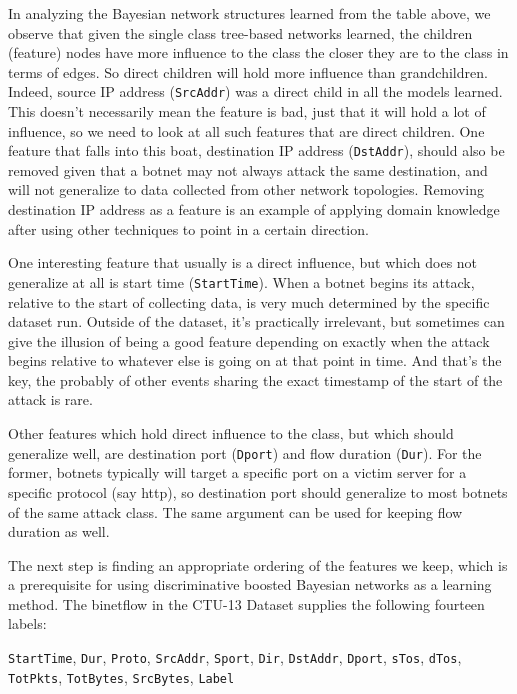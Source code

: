 \documentclass[letterpaper]{article}
\begin{document}
In analyzing the Bayesian network structures learned from the table above, we observe that given the single class tree-based networks learned, the children (feature) nodes have more influence to the class the closer they are to the class in terms of edges.  So direct children will hold more influence than grandchildren.  Indeed, source IP address (\texttt{SrcAddr}) was a direct child in all the models learned.  This doesn't necessarily mean the feature is bad, just that it will hold a lot of influence, so we need to look at all such features that are direct children.  One feature that falls into this boat, destination IP address (\texttt{DstAddr}), should also be removed given that a botnet may not always attack the same destination, and will not generalize to data collected from other network topologies. Removing destination IP address as a feature is an example of applying domain knowledge after using other techniques to point in a certain direction.

One interesting feature that usually is a direct influence, but which does not generalize at all is start time (\texttt{StartTime}).  When a botnet begins its attack, relative to the start of collecting data, is very much determined by the specific dataset run.  Outside of the dataset, it's practically irrelevant, but sometimes can give the illusion of being a good feature depending on exactly when the attack begins relative to whatever else is going on at that point in time.  And that's the key, the probably of other events sharing the exact timestamp of the start of the attack is rare.

Other features which hold direct influence to the class, but which should generalize well, are destination port (\texttt{Dport}) and flow duration (\texttt{Dur}). For the former, botnets typically will target a specific port on a victim server for a specific protocol (say http), so destination port should generalize to most botnets of the same attack class.  The same argument can be used for keeping flow duration as well.

The next step is finding an appropriate ordering of the features we keep, which is a prerequisite for using discriminative boosted Bayesian networks as a learning method.  The binetflow in the CTU-13 Dataset supplies the following fourteen labels:

\texttt{StartTime}, \texttt{Dur}, \texttt{Proto}, \texttt{SrcAddr}, \texttt{Sport}, \texttt{Dir}, \texttt{DstAddr}, \texttt{Dport}, \texttt{sTos}, \texttt{dTos}, \texttt{TotPkts}, \texttt{TotBytes}, \texttt{SrcBytes}, \texttt{Label}
\end{document}
